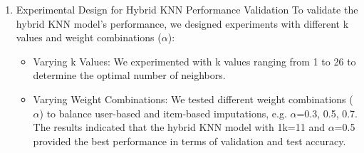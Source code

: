 \documentclass{article}
\begin{document}
\begin{enumerate}
\begin{itemize}
    \end{itemize}
    \item Experimental Design for Hybrid KNN Performance Validation\newline
    To validate the hybrid KNN model's performance, we designed experiments with different k values and weight combinations ($\alpha$):
    \begin{itemize}
        \item Varying k Values:\newline
        We experimented with k values ranging from 1 to 26 to determine the optimal number of neighbors.
        \item Varying Weight Combinations:\newline
        We tested different weight combinations ($\alpha$) to balance user-based and item-based imputations, e.g. $\alpha$=0.3, 0.5, 0.7.
        The results indicated that the hybrid KNN model with 1k=11 and $\alpha$=0.5 provided the best performance in terms of validation and test accuracy.
    \end{itemize}
\end{enumerate}
\newpage
\end{document}
